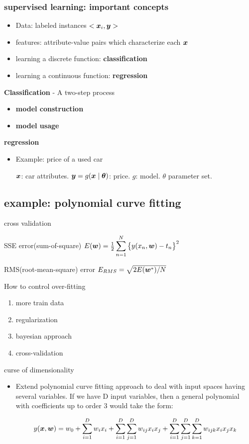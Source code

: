 \documentclass[11pt]{article}
\begin{document}
\subsubsection{supervised learning: important concepts}
\label{sec:org4620398}
\begin{itemize}
\item Data: labeled instances \(<\boldsymbol{x}_i,\boldsymbol{y}>\)
\item features: attribute-value pairs which characterize each \(\boldsymbol{x}\)
\item learning a discrete function: \textbf{classification}
\item learning a continuous function: \textbf{regression}
\end{itemize}

\textbf{Classification} - A two-step process
\begin{itemize}
\item \textbf{model construction}
\item \textbf{model usage}
\end{itemize}

\textbf{regression}
\begin{itemize}
\item Example: price of a used car

\(\boldsymbol{x}\): car attributes. \(\boldsymbol{y}=g(\boldsymbol{x}\mid\boldsymbol{\theta})\): price. \(g\):
model. \(\theta\) parameter set.
\end{itemize}
\subsection{example: polynomial curve fitting}
\label{sec:orgfd08bcc}
cross validation


SSE error(sum-of-square) \(E(\boldsymbol{w})=\frac{1}{2}\displaystyle\sum_{n=1}^N
   \left\{ y(x_n,\boldsymbol{w})-t_n\right\}^2\)

RMS(root-mean-square) error \(E_{RMS}=\sqrt{2E(\boldsymbol{w}^*)/N}\)


How to control over-fitting
\begin{enumerate}
\item more train data
\item regularization
\item bayesian approach
\item cross-validation
\end{enumerate}


curse of dimensionality
\begin{itemize}
\item Extend polynomial curve fitting approach to deal with input spaces having
several variables. If we have D input variables, then a general polynomial
with coefficients up to order 3 would take the form:

\begin{equation*}
y(\boldsymbol{x},\boldsymbol{w})=w_0+\displaystyle\sum_{i=1}^Dw_ix_i+
\displaystyle\sum_{i=1}^D \displaystyle\sum_{j=1}^Dw_{ij}x_ix_j+
\displaystyle\sum_{i=1}^D \displaystyle\sum_{j=1}^D
\displaystyle\sum_{k=1}^Dw_{ijk}x_ix_jx_k
\end{equation*}
\end{itemize}
\end{document}
